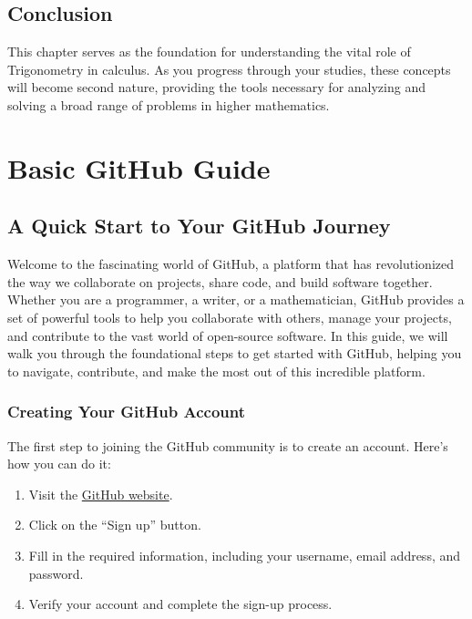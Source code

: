 \documentclass[a4paper,12pt]{book}
\newcounter{problem}
\begin{document}




\section*{Conclusion}
\label{sec:trig_conclusion}
This chapter serves as the foundation for understanding the vital role of Trigonometry in calculus. As you progress through your studies, these concepts will become second nature, providing the tools necessary for analyzing and solving a broad range of problems in higher mathematics.






\clearpage
{}
\appendix
\renewcommand{\thechapter}{\Roman{chapter}} %

\chapter{Basic GitHub Guide}
\section*{A Quick Start to Your GitHub Journey}

Welcome to the fascinating world of GitHub, a platform that has revolutionized the way we collaborate on projects, share code, and build software together. Whether you are a programmer, a writer, or a mathematician, GitHub provides a set of powerful tools to help you collaborate with others, manage your projects, and contribute to the vast world of open-source software. In this guide, we will walk you through the foundational steps to get started with GitHub, helping you to navigate, contribute, and make the most out of this incredible platform.

\subsection*{Creating Your GitHub Account}

The first step to joining the GitHub community is to create an account. Here’s how you can do it:

\begin{enumerate}
    \item Visit the \href{https://github.com/}{GitHub website}.
    \item Click on the “Sign up” button.
    \item Fill in the required information, including your username, email address, and password.
    \item Verify your account and complete the sign-up process.
\end{enumerate}
\end{document}
